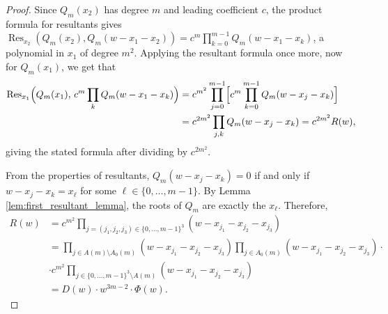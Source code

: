 \documentclass[11pt,reqno]{amsart}
\theoremstyle{remark}
\begin{document}
\begin{proof}
Since $Q_m(x_2)$ has degree $m$ and leading coefficient $c$, the product
formula for resultants gives $\operatorname{Res}_{x_2}(Q_m(x_2), Q_m(w-x_1-x_2)) = c^m\prod_{k=0}^{m-1} Q_m(w-x_1-x_k)$,
a polynomial in $x_1$ of degree $m^2$. Applying the resultant formula once more, now for
$Q_m(x_1)$, we get that
\begin{align*}
\operatorname{Res}_{x_1}\Bigl(Q_m(x_1),\, c^m\prod_k Q_m(w-x_1-x_k)\Bigr)
&= c^{m^2}\prod_{j=0}^{m-1}\Bigl[c^m\prod_{k=0}^{m-1} Q_m(w-x_j-x_k)\Bigr]
\\&= c^{2m^2}\prod_{j,k} Q_m(w-x_j-x_k) = c^{2m^2} R(w),
\end{align*}
giving the stated formula after dividing by $c^{2m^2}$.

From the properties of resultants, $Q_m(w-x_j-x_k) = 0$ if and only if $w - x_j - x_k = x_{\ell}$ for some $\ell \in \{0,\dots,m-1\}$.
By Lemma \ref{lem:first_resultant_lemma}, the roots of $Q_m$ are exactly the $x_\ell$. Therefore,
\begin{align*}
R(w)&=c^{m^2}\prod_{j=(j_1,j_2,j_3)\in\{0,...,m-1\}^3}(w-x_{j_1}-x_{j_2}-x_{j_3})\\
&=\prod_{j\in A(m)\setminus A_0(m)}(w-x_{j_1}-x_{j_2}-x_{j_3})\prod_{j\in A_0(m)}(w-x_{j_1}-x_{j_2}-x_{j_3})\cdot\\
&\cdot c^{m^2}\prod_{j\in\{0,...,m-1\}^3\setminus A(m)}(w-x_{j_1}-x_{j_2}-x_{j_3})\\
&=D(w)\cdot w^{3m-2}\cdot \Phi(w).
\end{align*}
\end{proof}
\end{document}
